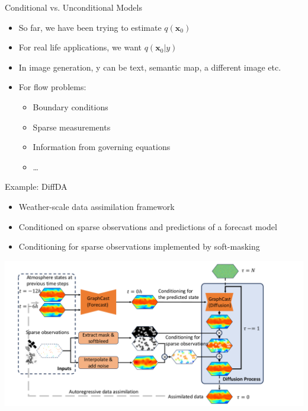 \documentclass[./main.tex]{subfiles}
\begin{document}
\begin{frame}[label={sec:orgd0d5d51}]{Conditional vs. Unconditional Models}
\begin{itemize}
\item So far, we have been trying to estimate \(q(\mathbf{x}_0)\)
\item For real life applications, we want \(q(\mathbf{x}_0|y)\)
\item In image generation, y can be text, semantic map, a different image etc.
\item For flow problems:
\begin{itemize}
\item Boundary conditions
\item Sparse measurements
\item Information from governing equations
\item \ldots{}
\end{itemize}
\end{itemize}
\end{frame}
\begin{frame}[label={sec:orgee273ea}]{Example: DiffDA}
\begin{itemize}
\item Weather-scale data assimilation framework
\item Conditioned on sparse observations and predictions of a forecast model
\item Conditioning for sparse observations implemented by soft-masking
\end{itemize}
\begin{adjustbox}{width=\textwidth,totalheight=0.6\paperheight,keepaspectratio,center}
\includegraphics[width=\textwidth]{./figs/diffda.png}
\end{adjustbox}
\end{frame}
\end{document}
